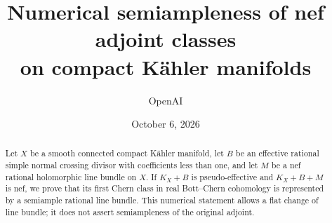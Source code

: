 \documentclass[11pt]{article}
\title{Numerical semiampleness of nef adjoint classes\\on compact K\"ahler manifolds}
\author{OpenAI}
\date{October 6, 2026}
\begin{document}
\maketitle
\begin{abstract}
Let \(X\) be a smooth connected compact K\"ahler manifold, let \(B\) be an
effective rational simple normal crossing divisor with coefficients less
than one, and let \(M\) be a nef rational holomorphic line bundle on \(X\).
If \(K_X+B\) is pseudo-effective and \(K_X+B+M\) is nef, we prove that its
first Chern class in real Bott--Chern cohomology is represented by a semiample
rational line bundle. This numerical statement allows a flat change of line
bundle; it does not assert semiampleness of the original adjoint.
\end{abstract}
\tableofcontents







\begingroup
\raggedright


\endgroup
\end{document}
